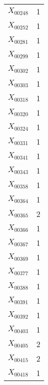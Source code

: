 \documentclass[a4paper,10pt]{article}
\begin{document}
\begin{center}
\begin{longtable}{cc}
$X_{00248}$ & 1 \\
$X_{00252}$ & 1 \\
$X_{00281}$ & 1 \\
$X_{00299}$ & 1 \\
$X_{00302}$ & 1 \\
$X_{00303}$ & 1 \\
$X_{00318}$ & 1 \\
$X_{00320}$ & 1 \\
$X_{00324}$ & 1 \\
$X_{00331}$ & 1 \\
$X_{00341}$ & 1 \\
$X_{00343}$ & 1 \\
$X_{00358}$ & 1 \\
$X_{00364}$ & 1 \\
$X_{00365}$ & 2 \\
$X_{00366}$ & 1 \\
$X_{00367}$ & 1 \\
$X_{00369}$ & 1 \\
$X_{00377}$ & 1 \\
$X_{00388}$ & 1 \\
$X_{00391}$ & 1 \\
$X_{00392}$ & 1 \\
$X_{00403}$ & 1 \\
$X_{00405}$ & 2 \\
$X_{00415}$ & 2 \\
$X_{00418}$ & 1 \\
\end{longtable}
\end{center}
\end{document}
